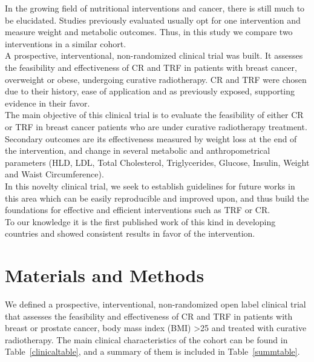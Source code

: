 \documentclass[journal,article,submit,pdftex,moreauthors]{Definitions/mdpi}
\begin{document}
{\color{blue}In the growing field of nutritional interventions and cancer, there is still much to be elucidated. Studies previously evaluated usually opt for one intervention and measure weight and metabolic outcomes. Thus, in this study we compare two interventions in a similar cohort.}\\ 

A prospective, interventional, non-randomized clinical trial was built. It assesses the feasibility and effectiveness of CR and TRF in patients with breast cancer, overweight or obese, undergoing curative radiotherapy. CR and TRF were chosen due to their history, ease of application and as previously exposed, supporting evidence in their favor.\\

{\color{blue}The main objective of this clinical trial is to evaluate the feasibility of either CR or TRF in breast cancer patients who are under curative radiotherapy treatment. Secondary outcomes are its effectiveness measured by weight loss at the end of the intervention, and change in several metabolic and anthropometrical parameters (HLD, LDL, Total Cholesterol, Triglycerides, Glucose, Insulin, Weight and Waist Circumference).}\\

In this novelty clinical trial, we seek to establish guidelines for future works in this area which can be easily reproducible and improved upon, and thus build the foundations for effective and efficient interventions such as TRF or CR.\\

To our knowledge it is the first published work of this kind in developing countries and showed consistent results in favor of the intervention.\\










\section{Materials and Methods}

We defined a prospective, interventional, non-randomized {\color{blue}open label} clinical trial that assesses the feasibility and effectiveness of CR and TRF in patients with breast or prostate cancer, body mass index (BMI) >25 and treated with curative radiotherapy. The main clinical characteristics of the cohort can be found in Table~\ref{clinicaltable}, and a summary of them is included in Table~\ref{summtable}.\\
\end{document}
